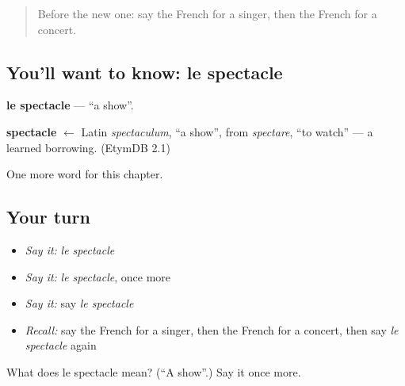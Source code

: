 \label{lesson:FR-C223-spectacle}



\begin{quote}
Before the new one: say the French for a singer, then the French for a concert.
\end{quote}

\subsection*{You'll want to know: le spectacle}
\textbf{le spectacle} — \textquotedblleft{}a show\textquotedblright{}.

\begin{cousinweb}
\textbf{spectacle} $\leftarrow$ Latin \emph{spectaculum}, \textquotedblleft{}a show\textquotedblright{}, from \emph{spectare}, \textquotedblleft{}to watch\textquotedblright{} — a learned borrowing. (EtymDB 2.1)
\end{cousinweb}

\begin{grammarlens}[title={What you've built}]
One more word for this chapter.
\end{grammarlens}

\subsection*{Your turn}
\begin{itemize}
\raggedright
  \item \emph{Say it:} \emph{le spectacle}
  \item \emph{Say it:} \emph{le spectacle}, once more
  \item \emph{Say it:} say \emph{le spectacle}
  \item \emph{Recall:} say the French for a singer, then the French for a concert, then say \emph{le spectacle} again
\end{itemize}

\begin{tcolorbox}[breakable,colback=teal!4,colframe=teal!35!black,title={Before you move on}]
What does le spectacle mean? (\textquotedblleft{}A show\textquotedblright{}.) Say it once more.
\end{tcolorbox}
